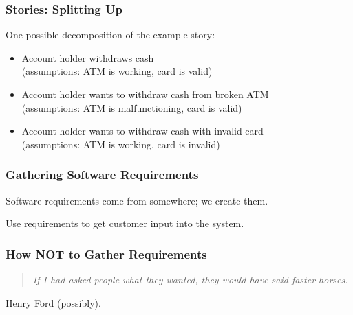 \begin{frame}
	\frametitle{Stories: Splitting Up}
	\begin{changemargin}{1cm}
	
	One possible decomposition of the example story:
	
\begin{itemize}
	\item Account holder withdraws cash\\
	\quad(assumptions: ATM is working, card is valid)
	\item Account holder wants to withdraw cash from broken ATM\\
	\quad(assumptions: ATM is malfunctioning, card is valid)
	\item Account holder wants to withdraw cash with invalid card\\
	\quad(assumptions: ATM is working, card is invalid)
\end{itemize}

	\end{changemargin}
\end{frame}



\begin{frame}
\frametitle{Gathering Software Requirements}

\begin{changemargin}{1cm}

Software requirements come from somewhere; we create them.

Use requirements to get customer input into the system.

\end{changemargin}
\end{frame}

\begin{frame}
\frametitle{How NOT to Gather Requirements}

\vspace{4cm}

\begin{quote}
	\textit{If I had asked people what they wanted, they would have said faster horses.}
\end{quote}
\hfill Henry Ford (possibly).



\end{frame}


